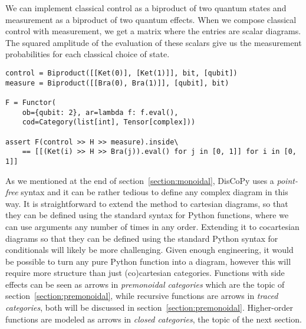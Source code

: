 \begin{example}\label{example:biproduct-measurement}
We can implement classical control as a biproduct of two quantum states and measurement as a biproduct of two quantum effects.
When we compose classical control with measurement, we get a matrix where the entries are scalar diagrams.
The squared amplitude of the evaluation of these scalars give us the measurement probabilities for each classical choice of state.

\begin{verbatim}
control = Biproduct([[Ket(0)], [Ket(1)]], bit, [qubit])
measure = Biproduct([[Bra(0), Bra(1)]], [qubit], bit)

F = Functor(
    ob={qubit: 2}, ar=lambda f: f.eval(),
    cod=Category(list[int], Tensor[complex]))

assert F(control >> H >> measure).inside\
    == [[(Ket(i) >> H >> Bra(j)).eval() for j in [0, 1]] for i in [0, 1]]
\end{verbatim}
\end{example}

As we mentioned at the end of section~\ref{section:monoidal}, DisCoPy uses a \emph{point-free} syntax and it can be rather tedious to define any complex diagram in this way.
It is straightforward to extend the \py{diagramize} method to cartesian diagrams, so that they can be defined using the standard syntax for Python functions, where we can use arguments any number of times in any order.
Extending it to cocartesian diagrams so that they can be defined using the standard Python syntax for conditionals will likely be more challenging.
Given enough engineering, it would be possible to turn any pure Python function into a diagram, however this will require more structure than just (co)cartesian categories.
Functions with side effects can be seen as arrows in \emph{premonoidal categories} which are the topic of section~\ref{section:premonoidal}, while recursive functions are arrows in \emph{traced categories}, both will be discussed in section~\ref{section:premonoidal}.
Higher-order functions are modeled as arrows in \emph{closed categories}, the topic of the next section.
